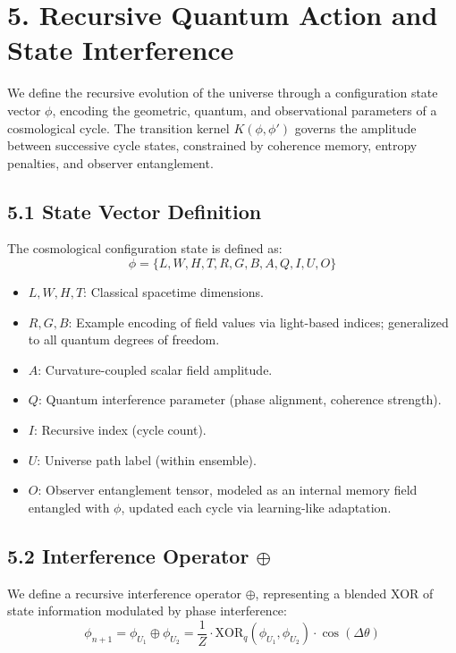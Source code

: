 \section*{5. Recursive Quantum Action and State Interference}
\label{sec:recursive-action}

We define the recursive evolution of the universe through a configuration state vector \( \phi \), encoding the geometric, quantum, and observational parameters of a cosmological cycle. The transition kernel \( K(\phi, \phi') \) governs the amplitude between successive cycle states, constrained by coherence memory, entropy penalties, and observer entanglement.

\subsection*{5.1 State Vector Definition}

The cosmological configuration state is defined as:
\begin{equation}
\phi = \{L, W, H, T, R, G, B, A, Q, I, U, O\}
\end{equation}

\begin{itemize}
  \item \( L, W, H, T \): Classical spacetime dimensions.
  \item \( R, G, B \): Example encoding of field values via light-based indices; generalized to all quantum degrees of freedom.
  \item \( A \): Curvature-coupled scalar field amplitude.
  \item \( Q \): Quantum interference parameter (phase alignment, coherence strength).
  \item \( I \): Recursive index (cycle count).
  \item \( U \): Universe path label (within ensemble).
  \item \( O \): Observer entanglement tensor, modeled as an internal memory field entangled with \( \phi \), updated each cycle via learning-like adaptation.
\end{itemize}

\subsection*{5.2 Interference Operator \( \oplus \)}

We define a recursive interference operator \( \oplus \), representing a blended XOR of state information modulated by phase interference:
\begin{equation}
\phi_{n+1} = \phi_{U_1} \oplus \phi_{U_2} = \frac{1}{Z} \cdot \text{XOR}_q(\phi_{U_1}, \phi_{U_2}) \cdot \cos(\Delta \theta)
\end{equation}

